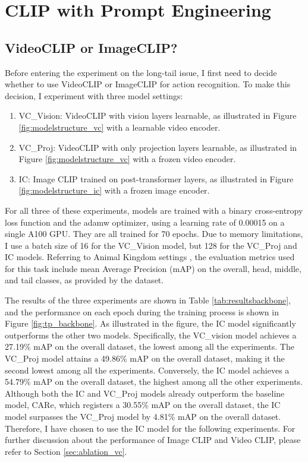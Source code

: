 \section{CLIP with Prompt Engineering}
\subsection{VideoCLIP or ImageCLIP?}
\label{sec:imageclipbetter}
Before entering the experiment on the long-tail issue, I first need to decide whether to use VideoCLIP or ImageCLIP for action recognition. To make this decision, I experiment with three model settings: 

\begin{enumerate}
    \item VC\_Vision: VideoCLIP with vision layers learnable, as illustrated in Figure \ref{fig:modelstructure_vc} with a learnable video encoder.
    \item VC\_Proj: VideoCLIP with only projection layers learnable, as illustrated in Figure \ref{fig:modelstructure_vc} with a frozen video encoder.
    \item IC: Image CLIP trained on post-transformer layers, as illustrated in Figure \ref{fig:modelstructure_ic} with a frozen image encoder.
\end{enumerate}

For all three of these experiments, models are trained with a binary cross-entropy loss function and the adamw optimizer, using a learning rate of 0.00015 on a single A100 GPU. They are all trained for 70 epochs. Due to memory limitations, I use a batch size of 16 for the VC\_Vision model, but 128 for the VC\_Proj and IC models. Referring to Animal Kingdom settings \parencite{ng2022animal}, the evaluation metrics used for this task include mean Average Precision (mAP) on the overall, head, middle, and tail classes, as provided by the dataset. 


The results of the three experiments are shown in Table \ref{tab:resultsbackbone}, and the performance on each epoch during the training process is shown in Figure \ref{fig:tp_backbone}. As illustrated in the figure, the IC model significantly outperforms the other two models. Specifically, the VC\_vision model achieves a 27.19\% mAP on the overall dataset, the lowest among all the experiments. The VC\_Proj model attains a 49.86\% mAP on the overall dataset, making it the second lowest among all the experiments. Conversely, the IC model achieves a 54.79\% mAP on the overall dataset, the highest among all the other experiments. Although both the IC and VC\_Proj models already outperform the baseline model, CARe, which registers a 30.55\% mAP on the overall dataset, the IC model surpasses the VC\_Proj model by 4.81\% mAP on the overall dataset. Therefore, I have chosen to use the IC model for the following experiments. For further discussion about the performance of Image CLIP and Video CLIP, please refer to Section \ref{sec:ablation_vc}.

